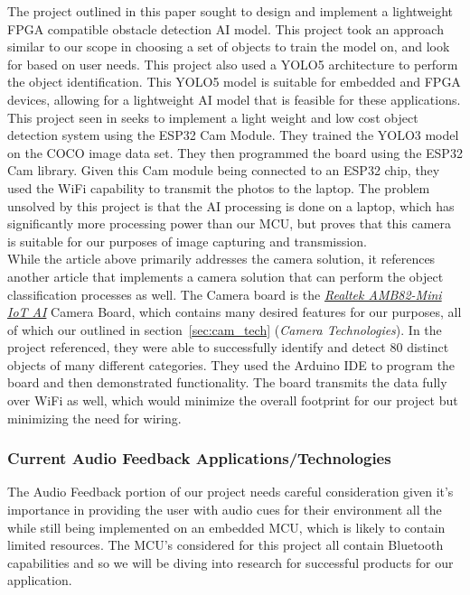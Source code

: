 \noindent The project outlined in this paper \cite{CVRef2} sought to design and implement a lightweight FPGA compatible obstacle detection AI model. This project took an approach similar to our scope in choosing a set of objects to train the model on, and look for based on user needs. This project also used a YOLO5 architecture to perform the object identification. This YOLO5 model is suitable for embedded and FPGA devices, allowing for a lightweight AI model that is feasible for these applications. \\


\noindent This project seen in \cite{ESP32CamRef1} seeks to implement a light weight and low cost object detection system using the ESP32 Cam Module. They trained the YOLO3 model on the COCO image data set. They then programmed the board using the ESP32 Cam library. Given this Cam module being connected to an ESP32 chip, they used the WiFi capability to transmit the photos to the laptop. The problem unsolved by this project is that the AI processing is done on a laptop, which has significantly more processing power than our MCU, but proves that this camera is suitable for our purposes of image capturing and transmission. \\

\noindent While the article above primarily addresses the camera solution, it references another article \cite{RealTekCamRef1} that implements a camera solution that can perform the object classification processes as well. The Camera board is the \underline{\textit{Realtek AMB82-Mini IoT AI}} Camera Board, which contains many desired features for our purposes, all of which our outlined in section~\ref{sec:cam_tech} (\textit{Camera Technologies}). In the project referenced, they were able to successfully identify and detect 80 distinct objects of many different categories. They used the Arduino IDE to program the board and then demonstrated functionality. The board transmits the data fully over WiFi as well, which would minimize the overall footprint for our project but minimizing the need for wiring.\\


\subsubsection{Current Audio Feedback Applications/Technologies}
\noindent The Audio Feedback portion of our project needs careful consideration given it's importance in providing the user with audio cues for their environment all the while still being implemented on an embedded MCU, which is likely to contain limited resources. The MCU's considered for this project all contain Bluetooth capabilities and so we will be diving into research for successful products for our application. \\

